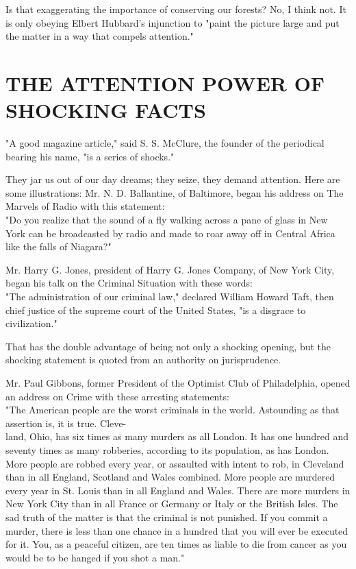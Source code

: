 \documentclass[10pt]{article}
\begin{document}
Is that exaggerating the importance of conserving our forests? No, I think not. It is only obeying Elbert Hubbard's injunction to "paint the picture large and put the matter in a way that compels attention."

\section*{THE ATTENTION POWER OF SHOCKING FACTS}
"A good magazine article," said S. S. McClure, the founder of the periodical bearing his name, "is a series of shocks."

They jar us out of our day dreams; they seize, they demand attention. Here are some illustrations: Mr. N. D. Ballantine, of Baltimore, began his address on The Marvels of Radio with this statement:\\
"Do you realize that the sound of a fly walking across a pane of glass in New York can be broadcasted by radio and made to roar away off in Central Africa like the falls of Niagara?"

Mr. Harry G. Jones, president of Harry G. Jones Company, of New York City, began his talk on the Criminal Situation with these words:\\
"The administration of our criminal law," declared William Howard Taft, then chief justice of the supreme court of the United States, "is a disgrace to civilization."

That has the double advantage of being not only a shocking opening, but the shocking statement is quoted from an authority on jurisprudence.

Mr. Paul Gibbons, former President of the Optimist Club of Philadelphia, opened an address on Crime with these arresting statements:\\
"The American people are the worst criminals in the world. Astounding as that assertion is, it is true. Cleve-\\
land, Ohio, has six times as many murders as all London. It has one hundred and seventy times as many robberies, according to its population, as has London. More people are robbed every year, or assaulted with intent to rob, in Cleveland than in all England, Scotland and Wales combined. More people are murdered every year in St. Louis than in all England and Wales. There are more murders in New York City than in all France or Germany or Italy or the British Isles. The sad truth of the matter is that the criminal is not punished. If you commit a murder, there is less than one chance in a hundred that you will ever be executed for it. You, as a peaceful citizen, are ten times as liable to die from cancer as you would be to be hanged if you shot a man."
\end{document}
